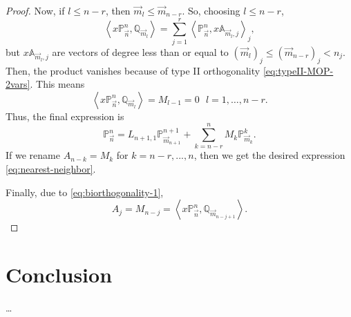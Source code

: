 \documentclass[12pt,a4]{article}
\theoremstyle{plain}
\newcommand{\prodesc}[2]{\left\langle #1 , #2 \right\rangle}
\begin{document}
\begin{proof}
    Now, if $l\leq n-r$, then $\overrightarrow{m}_l\leq \overrightarrow{m}_{n-r}$. So, choosing $l\leq n-r$,
    $$
    \prodesc{x\mathbb P_{\vec n}^n}{\mathbb Q_{\overrightarrow{m}_l}} = \sum_{j=1}^r  \prodesc{\mathbb P_{\vec n}^n}{x\mathbb A_{\overrightarrow{m}_l,j}}_j,
    $$
    but $x\mathbb A_{\overrightarrow{m}_l,j}$ are vectors of degree less than or equal to $(\overrightarrow{m}_l)_j\leq (\overrightarrow{m}_{n-r})_j < n_j$. Then, the product vanishes because of type II orthogonality \eqref{eq:typeII-MOP-2vars}. This means
    $$
    \prodesc{x\mathbb P_{\vec n}^n}{\mathbb Q_{\overrightarrow{m}_l}} = M_{l-1} = 0 \ \ \ l = 1, \dots, n-r.
    $$
    Thus, the final expression is
    $$
    \mathbb P_{\overrightarrow{n}}^n = L_{n+1,1}\mathbb P_{\overrightarrow{m}_{n+1}}^{n+1} + \sum_{k=n-r}^{n} M_k \mathbb P_{\overrightarrow{m}_k}^k.
    $$
    If we rename $A_{n-k} = M_k$ for $k=n-r,...,n$, then we get the desired expression \eqref{eq:nearest-neighbor}. 

    Finally, due to \eqref{eq:biorthogonality-1}, $$A_j = M_{n-j} =  \prodesc{x\mathbb P_{\vec n}^n}{\mathbb Q_{\overrightarrow{m}_{n-j+1}}}.$$
\end{proof}


\section{Conclusion}
\dots

\nocite{*}
{}

\end{document}
